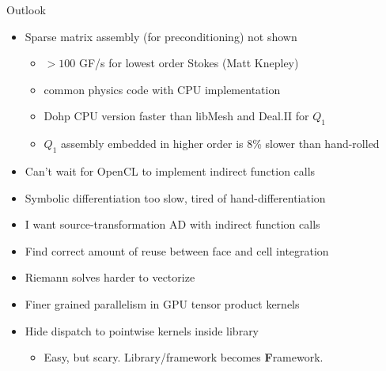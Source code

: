\documentclass{beamer}
\begin{document}
\begin{frame}{Outlook}
  \begin{itemize}
  \item Sparse matrix assembly (for preconditioning) not shown
    \begin{itemize}
    \item $> 100$ GF/s for lowest order Stokes (Matt Knepley)
    \item common physics code with CPU implementation
    \item Dohp CPU version faster than libMesh and Deal.II for $Q_1$
    \item $Q_1$ assembly embedded in higher order is 8\% slower than hand-rolled
    \end{itemize}
  \item Can't wait for OpenCL to implement indirect function calls
  \item Symbolic differentiation too slow, tired of hand-differentiation
  \item I want source-transformation AD with indirect function calls
  \item Find correct amount of reuse between face and cell integration
  \item Riemann solves harder to vectorize
  \item Finer grained parallelism in GPU tensor product kernels
  \item Hide dispatch to pointwise kernels inside library
    \begin{itemize}
    \item Easy, but scary. Library/framework becomes \alert{\bf F}ramework.
    \end{itemize}
  \end{itemize}
\end{frame}
\end{document}
